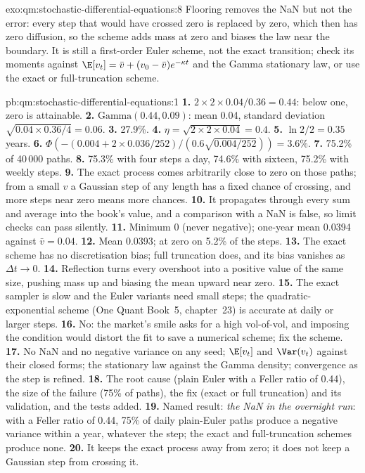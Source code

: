 \begin{solution}{exo:qm:stochastic-differential-equations:8}
Flooring removes the NaN but not the error: every step that would have crossed zero is replaced by
zero, which then has zero diffusion, so the scheme adds mass at zero and biases the law near the
boundary. It is still a first-order Euler scheme, not the exact transition; check its moments
against $\E[v_t] = \bar v + (v_0 - \bar v)e^{-\kappa t}$ and the Gamma stationary law, or use the exact or
full-truncation scheme.
\end{solution}

\begin{solution}{pb:qm:stochastic-differential-equations:1}
\textbf{1.} $2 \times 2 \times 0.04/0.36 = 0.44$: below one, zero is attainable.
\textbf{2.} $\mathrm{Gamma}(0.44, 0.09)$: mean 0.04, standard deviation $\sqrt{0.04 \times 0.36/4} = 0.06$.
\textbf{3.} 27.9\%.
\textbf{4.} $\eta = \sqrt{2 \times 2 \times 0.04} = 0.4$.
\textbf{5.} $\ln 2/2 = 0.35$ years.
\textbf{6.} $\Phi(-(0.004 + 2 \times 0.036/252)/(0.6\sqrt{0.004/252})) = 3.6\%$.
\textbf{7.} 75.2\% of 40\,000 paths.
\textbf{8.} 75.3\% with four steps a day, 74.6\% with sixteen, 75.2\% with weekly steps.
\textbf{9.} The exact process comes arbitrarily close to zero on those paths; from a small $v$ a
Gaussian step of any length has a fixed chance of crossing, and more steps near zero means more
chances.
\textbf{10.} It propagates through every sum and average into the book's value, and a comparison
with a NaN is false, so limit checks can pass silently.
\textbf{11.} Minimum 0 (never negative); one-year mean 0.0394 against $\bar v = 0.04$.
\textbf{12.} Mean 0.0393; at zero on 5.2\% of the steps.
\textbf{13.} The exact scheme has no discretisation bias; full truncation does, and its bias
vanishes as $\Delta t \to 0$.
\textbf{14.} Reflection turns every overshoot into a positive value of the same size, pushing mass
up and biasing the mean upward near zero.
\textbf{15.} The exact sampler is slow and the Euler variants need small steps; the
quadratic-exponential scheme (One Quant Book~5, chapter~23) is accurate at daily or larger steps.
\textbf{16.} No: the market's smile asks for a high vol-of-vol, and imposing the condition would
distort the fit to save a numerical scheme; fix the scheme.
\textbf{17.} No NaN and no negative variance on any seed; $\E[v_t]$ and $\Var(v_t)$ against their closed
forms; the stationary law against the Gamma density; convergence as the step is refined.
\textbf{18.} The root cause (plain Euler with a Feller ratio of 0.44), the size of the failure (75\% of
paths), the fix (exact or full truncation) and its validation, and the tests added.
\textbf{19.} Named result: \emph{the NaN in the overnight run}: with a Feller ratio of 0.44, 75\% of
daily plain-Euler paths produce a negative variance within a year, whatever the step; the exact
and full-truncation schemes produce none.
\textbf{20.} It keeps the exact process away from zero; it does not keep a Gaussian step from
crossing it.
\end{solution}


